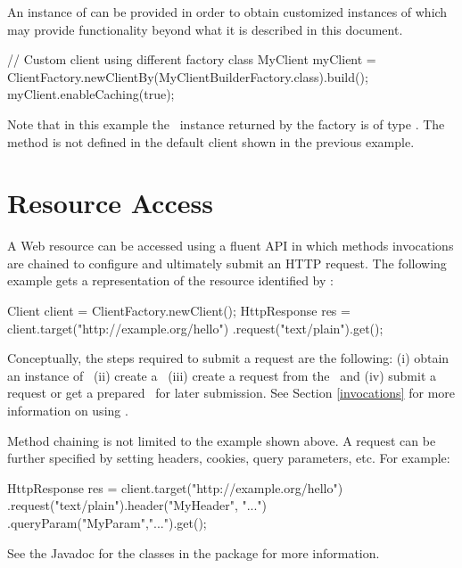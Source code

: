 An instance of  can be provided in order to obtain customized instances of  which may provide functionality beyond what it is described in this document.  

\begin{listing}{1}
// Custom client using different factory class
MyClient myClient = 
    ClientFactory.newClientBy(MyClientBuilderFactory.class).build();
myClient.enableCaching(true);
\end{listing}

Note that in this example the \Client\ instance returned by the factory is of type . The method  is not defined in the default client shown in the previous example.

\section{Resource Access}
\label{resource_access}

A Web resource can be accessed using a fluent API in which methods invocations are chained to configure and ultimately submit an HTTP request. The following example gets a  representation of the resource identified by :

\begin{listing}{1}
Client client = ClientFactory.newClient();
HttpResponse res = client.target("http://example.org/hello")
    .request("text/plain").get();
\end{listing}

Conceptually, the steps required to submit a request are the following: (i) obtain an instance of \Client\ (ii) create a \Target\ (iii) create a request from the \Target\ and (iv) submit a request or get a prepared \Invocation\ for later submission. See Section \ref{invocations} for more information on using \Invocation.

Method chaining is not limited to the example shown above. A request can be further specified by setting headers, cookies, query parameters, etc. For example:

\begin{listing}{1}
HttpResponse res = client.target("http://example.org/hello")
    .request("text/plain").header("MyHeader", "...")
    .queryParam("MyParam","...").get();
\end{listing}

See the Javadoc for the classes in the  package for more information.

